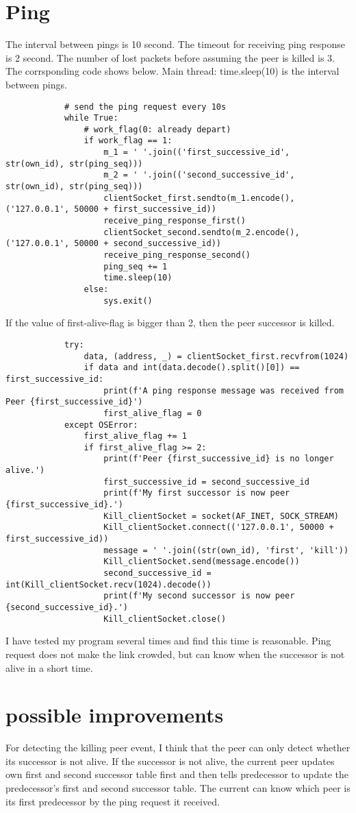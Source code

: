 \documentclass{article}
\begin{document}
	\section{Ping}
		The interval between pings is 10 second. The timeout for receiving ping response is 2 second. The number of lost packets before assuming the peer is killed is 3. The corrsponding code shows below.
		Main thread: time.sleep(10) is the interval between pings.
		\begin{lstlisting}
			# send the ping request every 10s
			while True:
				# work_flag(0: already depart)
				if work_flag == 1:
					m_1 = ' '.join(('first_successive_id', str(own_id), str(ping_seq)))
					m_2 = ' '.join(('second_successive_id', str(own_id), str(ping_seq)))
					clientSocket_first.sendto(m_1.encode(), ('127.0.0.1', 50000 + first_successive_id))
					receive_ping_response_first()
					clientSocket_second.sendto(m_2.encode(), ('127.0.0.1', 50000 + second_successive_id))
					receive_ping_response_second()
					ping_seq += 1
					time.sleep(10)
				else:
					sys.exit()
		\end{lstlisting}
		If the value of first-alive-flag is bigger than 2, then the peer successor is killed. 
		\begin{lstlisting}
		    try:
				data, (address, _) = clientSocket_first.recvfrom(1024)
				if data and int(data.decode().split()[0]) == first_successive_id:
					print(f'A ping response message was received from Peer {first_successive_id}')
					first_alive_flag = 0
			except OSError:
				first_alive_flag += 1
				if first_alive_flag >= 2:
					print(f'Peer {first_successive_id} is no longer alive.')
					first_successive_id = second_successive_id
					print(f'My first successor is now peer {first_successive_id}.')
					Kill_clientSocket = socket(AF_INET, SOCK_STREAM)
					Kill_clientSocket.connect(('127.0.0.1', 50000 + first_successive_id))
					message = ' '.join((str(own_id), 'first', 'kill'))
					Kill_clientSocket.send(message.encode())
					second_successive_id = int(Kill_clientSocket.recv(1024).decode())
					print(f'My second successor is now peer {second_successive_id}.')
					Kill_clientSocket.close()
		\end{lstlisting}
			I have tested my program several times and find this time is reasonable. Ping request does not make the link crowded, but can know when the successor is not alive in a short time.
	\section{possible improvements}
		For detecting the killing peer event, I think that the peer can only detect whether its successor is not alive. If the successor is not alive, the current peer updates own first and second successor table first and then tells predecessor to update the predecessor's first and second successor table. The current can know which peer is its first predecessor by the ping request it received.
\end{document}
